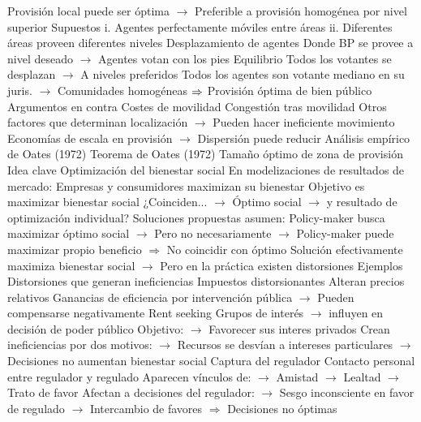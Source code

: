 \documentclass{nuevotema}
\begin{document}
\begin{esquemal}
				\4[] Provisión local puede ser óptima
				\4[] $\to$ Preferible a provisión homogénea por nivel superior
				\4 Supuestos
				\4[] i. Agentes perfectamente móviles entre áreas
				\4[] ii. Diferentes áreas proveen diferentes niveles
				\4 Desplazamiento de agentes
				\4[] Donde BP se provee a nivel deseado
				\4[] $\to$ Agentes votan con los pies
				\4 Equilibrio
				\4[] Todos los votantes se desplazan
				\4[] $\to$ A niveles preferidos
				\4[] Todos los agentes son votante mediano en su juris.
				\4[] $\to$ Comunidades homogéneas
				\4[] $\Rightarrow$ Provisión óptima de bien público
				\4 Argumentos en contra
				\4[] Costes de movilidad
				\4[] Congestión tras movilidad
				\4[] Otros factores que determinan localización
				\4[] $\to$ Pueden hacer ineficiente movimiento
				\4[] Economías de escala en provisión
				\4[] $\to$ Dispersión puede reducir
			\3 Análisis empírico de Oates (1972)
			\3 Teorema de Oates (1972)
			\3 Tamaño óptimo de zona de provisión
	\1 
		\2 Idea clave
			\3 Optimización del bienestar social
				\4 En modelizaciones de resultados de mercado:
				\4[] Empresas y consumidores maximizan su bienestar
				\4[] Objetivo es maximizar bienestar social
				\4[] ¿Coinciden...
				\4[] $\to$ Óptimo social
				\4[] $\to$ y resultado de optimización individual?
				\4 Soluciones propuestas asumen:
				\4[] Policy-maker busca maximizar óptimo social
				\4[] $\to$ Pero no necesariamente
				\4[] $\to$ Policy-maker puede maximizar propio beneficio
				\4[] $\Rightarrow$ No coincidir con óptimo
				\4[] Solución efectivamente maximiza bienestar social
				\4[] $\to$ Pero en la práctica existen distorsiones
		\2 Ejemplos
			\3 Distorsiones que generan ineficiencias
				\4 Impuestos distorsionantes
				\4[] Alteran precios relativos
				\4 Ganancias de eficiencia por intervención pública
				\4[] $\to$ Pueden compensarse negativamente
			\3 Rent seeking
				\4 Grupos de interés
				\4[] $\to$ influyen en decisión de poder público
				\4[] Objetivo:
				\4[] $\to$ Favorecer sus interes privados
				\4 Crean ineficiencias por dos motivos:
				\4[] $\to$ Recursos se desvían a intereses particulares
				\4[] $\to$ Decisiones no aumentan bienestar social
			\3 Captura del regulador
				\4 Contacto personal entre regulador y regulado
				\4[] Aparecen vínculos de:
				\4[] $\to$ Amistad
				\4[] $\to$ Lealtad
				\4[] $\to$ Trato de favor
				\4[] Afectan a decisiones del regulador:
				\4[] $\to$ Sesgo inconsciente en favor de regulado
				\4[] $\to$ Intercambio de favores
				\4[] $\Rightarrow$ Decisiones no óptimas

\end{esquemal}
\end{document}
